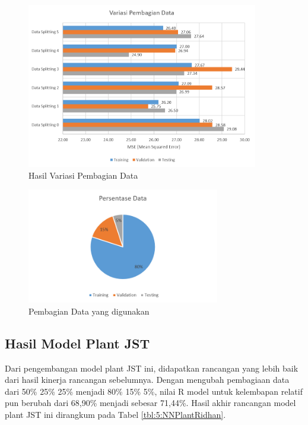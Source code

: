 \begin{figure}[!h]
	\centering
	\includegraphics[width=0.9\textwidth]{figures/DataSplittingResult}
	\caption{Hasil Variasi Pembagian Data}
	\label{fig:5:DataSplittingResult}
\end{figure}

\begin{figure}[!h]
	\centering
	\includegraphics[width=0.75\textwidth]{figures/DataSplittingFinal}
	\caption{Pembagian Data yang digunakan}
	\label{fig:5:DataSplittingFinal}
\end{figure}
\vspace{1em}

\subsection{Hasil Model Plant JST}

Dari pengembangan model plant JST ini, didapatkan rancangan yang lebih baik dari hasil kinerja rancangan sebelumnya. Dengan mengubah pembagiaan data dari 50\% 25\% 25\% menjadi 80\% 15\% 5\%, nilai R model untuk kelembapan relatif pun berubah dari 68,90\% menjadi sebesar 71,44\%. Hasil akhir rancangan model plant JST ini dirangkum pada Tabel \ref{tbl:5:NNPlantRidhan}.

